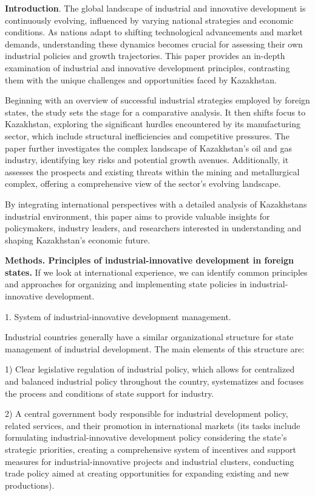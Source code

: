 \begin{multicols}{2}
{\bfseries Introduction}. The global landscape of industrial and innovative
development is continuously evolving, influenced by varying national
strategies and economic conditions. As nations adapt to shifting
technological advancements and market demands, understanding these
dynamics becomes crucial for assessing their own industrial policies and
growth trajectories. This paper provides an in-depth examination of
industrial and innovative development principles, contrasting them with
the unique challenges and opportunities faced by Kazakhstan.

Beginning with an overview of successful industrial strategies employed
by foreign states, the study sets the stage for a comparative analysis.
It then shifts focus to Kazakhstan, exploring the significant hurdles
encountered by its manufacturing sector, which include structural
inefficiencies and competitive pressures. The paper further investigates
the complex landscape of Kazakhstan's oil and gas industry, identifying
key risks and potential growth avenues. Additionally, it assesses the
prospects and existing threats within the mining and metallurgical
complex, offering a comprehensive view of the sector's evolving
landscape.

By integrating international perspectives with a detailed analysis of
Kazakhstan\textquotesingle s industrial environment, this paper aims to
provide valuable insights for policymakers, industry leaders, and
researchers interested in understanding and shaping Kazakhstan's
economic future.

{\bfseries Methods. Principles of industrial-innovative development in
foreign states.} If we look at international experience, we can identify
common principles and approaches for organizing and implementing state
policies in industrial-innovative development.

1. System of industrial-innovative development management.

Industrial countries generally have a similar organizational structure
for state management of industrial development. The main elements of
this structure are:

1) Clear legislative regulation of industrial policy, which allows for
centralized and balanced industrial policy throughout the country,
systematizes and focuses the process and conditions of state support for
industry.

2) A central government body responsible for industrial development
policy, related services, and their promotion in international markets
(its tasks include formulating industrial-innovative development policy
considering the state's strategic priorities, creating a comprehensive
system of incentives and support measures for industrial-innovative
projects and industrial clusters, conducting trade policy aimed at
creating opportunities for expanding existing and new productions).


\end{multicols}
